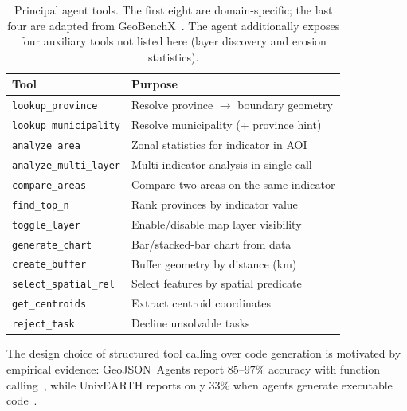 \documentclass[sigconf]{acmart}
\begin{document}
\begin{table}[ht]
    \caption{Principal agent tools. The first eight are domain-specific; the last four are adapted from GeoBenchX~\citep{krechetova2025geobenchx}. The agent additionally exposes four auxiliary tools not listed here (layer discovery and erosion statistics).}
    \label{tab:tools}
    \centering
    \begin{tabular}{lp{4.8cm}}
        \toprule
        \textbf{Tool} & \textbf{Purpose} \\
        \midrule
        \texttt{lookup\_province} & Resolve province $\to$ boundary geometry \\
        \texttt{lookup\_municipality} & Resolve municipality (+ province hint) \\
        \texttt{analyze\_area} & Zonal statistics for indicator in AOI \\
        \texttt{analyze\_multi\_layer} & Multi-indicator analysis in single call \\
        \texttt{compare\_areas} & Compare two areas on the same indicator \\
        \texttt{find\_top\_n} & Rank provinces by indicator value \\
        \texttt{toggle\_layer} & Enable/disable map layer visibility \\
        \texttt{generate\_chart} & Bar/stacked-bar chart from data \\
        \midrule
        \texttt{create\_buffer} & Buffer geometry by distance (km) \\
        \texttt{select\_spatial\_rel} & Select features by spatial predicate \\
        \texttt{get\_centroids} & Extract centroid coordinates \\
        \texttt{reject\_task} & Decline unsolvable tasks \\
        \bottomrule
    \end{tabular}
\end{table}

The design choice of structured tool calling over code generation is motivated by empirical evidence: GeoJSON~Agents report $85$--$97\%$ accuracy with function calling~\citep{luo2025geojsonagents}, while UnivEARTH reports only $33\%$ when agents generate executable code~\citep{kao2025univearth}.
\end{document}

